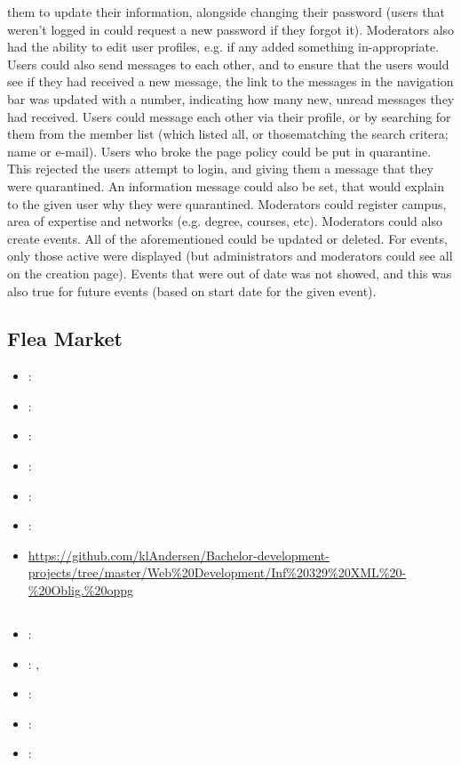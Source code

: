 them to update their information, alongside changing their password (users that weren't logged in
could request a new password if they forgot it). Moderators also had the ability to edit user profiles,
e.g. if any added something in-appropriate.
Users could also send messages to each other, and to ensure that the users would see if they had
received a new message, the link to the messages in the navigation bar was updated with a
number, indicating how many new, unread messages they had received. Users could message
each other via their profile, or by searching for them from the member list (which listed all, or thosematching the search critera; name or e-mail). Users who broke the page policy could be put in
quarantine. This rejected the users attempt to login, and giving them a message that they were
quarantined. An information message could also be set, that would explain to the given user why
they were quarantined.
Moderators could register campus, area of expertise and networks (e.g. degree, courses, etc).
Moderators could also create events. All of the aforementioned could be updated or deleted. For
events, only those active were displayed (but administrators and moderators could see all on the
creation page). Events that were out of date was not showed, and this was also true for future
events (based on start date for the given event).

\subsection{Flea Market}
\label{sec:flea_market}
\begin{itemize} 
	\item {}: 
	\item {}: 
	\item {}: 
	\item {}: 
	\item {}: 
	\item {}: 
	\item {} \url{https://github.com/klAndersen/Bachelor-development-projects/tree/master/Web%20Development/Inf%20329%20XML%20-%20Oblig.%20oppg}
\end{itemize} 

\subsection[Applied Computer Science Project]{}
\label{sec:appl_comp_sci_proj}
\begin{itemize} 
	\item {}: 
	\item {}: , 
	\item {}: 
	\item {}: 
	\item {}: 
\end{itemize} 


